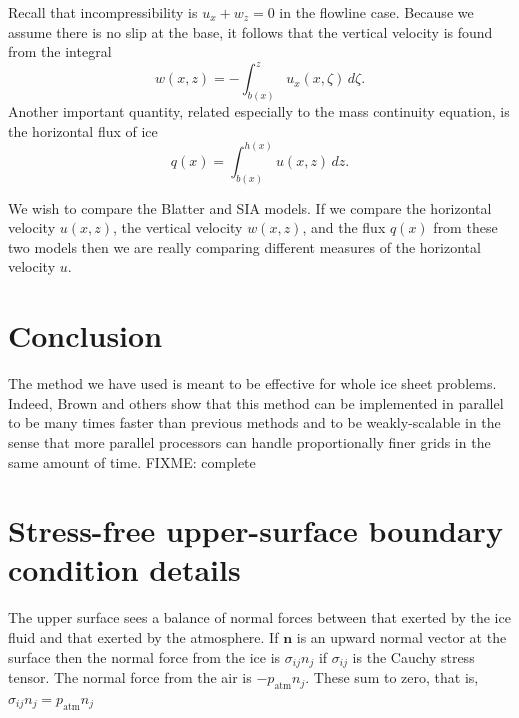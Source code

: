 \documentclass[11pt,final,reqno]{amsart}
\theoremstyle{remark}
\theoremstyle{definition}
\begin{document}
Recall that incompressibility is $u_x + w_z = 0$ in the flowline case.  Because we assume there is no slip at the base, it follows that the vertical velocity is found from the integral
\begin{equation}
w(x,z) = - \int_{b(x)}^z u_x(x,\zeta)\,d\zeta. \label{incomp}
\end{equation}
Another important quantity, related especially to the mass continuity equation, is the horizontal flux of ice
\begin{equation}
q(x) = \int_{b(x)}^{h(x)} u(x,z)\,dz.\label{flux}
\end{equation}

We wish to compare the Blatter and SIA models.  If we compare the horizontal velocity $u(x,z)$, the vertical velocity $w(x,z)$, and the flux $q(x)$ from these two models then we are really comparing different measures of the horizontal velocity $u$.


\newpage
\section{Conclusion}  The method we have used is meant to be effective for whole ice sheet problems.  Indeed, Brown and others \cite{BrownSmithAhmadia} show that this method can be implemented in parallel to be many times faster than previous methods and to be weakly-scalable in the sense that more parallel processors can handle proportionally finer grids in the same amount of time.  FIXME: complete

\newpage





\appendix

\newpage
\section{Stress-free upper-surface boundary condition details}  The upper surface sees a balance of normal forces between that exerted by the ice fluid and that exerted by the atmosphere.  If $\mathbf{n}$ is an upward normal vector at the surface then the normal force from the ice is $\sigma_{ij} n_j$ if $\sigma_{ij}$ is the Cauchy stress tensor.  The normal force from the air is $-p_{\text{atm}} n_j$.  These sum to zero, that is, $\sigma_{ij} n_j = p_{\text{atm}} n_j$
\end{document}

